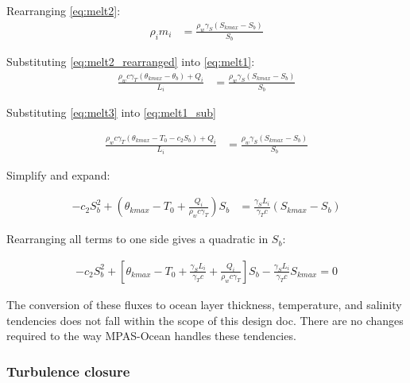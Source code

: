 \documentclass[11pt]{report}
\begin{document}

\noindent
Rearranging \ref{eq:melt2}:
\begin{align}
\rho_i m_i &= \frac{\rho_w \gamma_S (S_{kmax} - S_b)}{S_b} \label{eq:melt2_rearranged}
\end{align}

Substituting \ref{eq:melt2_rearranged} into \ref{eq:melt1}:
\begin{align}
\frac{\rho_w c \gamma_T (\theta_{kmax} - \theta_b) + Q_i}{L_i}
    &= \frac{\rho_w \gamma_S (S_{kmax} - S_b)}{S_b}  \label{eq:melt1_sub}
\end{align}

\noindent
Substituting \ref{eq:melt3} into \ref{eq:melt1_sub}

\begin{align}
\frac{\rho_w c \gamma_T (\theta_{kmax} - T_0 - c_2 S_b) + Q_i}{L_i}
    &= \frac{\rho_w \gamma_S (S_{kmax} - S_b)}{S_b}
\end{align}

\noindent
Simplify and expand:

\begin{align}
- c_2 S_b^2
+ \left( \theta_{kmax} - T_0 + \frac{Q_i}{\rho_w c \gamma_T} \right) S_b
    &= \frac{\gamma_S L_i}{\gamma_T c} (S_{kmax} - S_b)
\end{align}

\noindent
Rearranging all terms to one side gives a quadratic in $S_b$:

\begin{align}
- c_2 S_b^2
+ \left[ \theta_{kmax} - T_0
+ \frac{\gamma_S L_i}{\gamma_T c}
+ \frac{Q_i}{\rho_w c \gamma_T} \right] S_b
- \frac{\gamma_S L_i}{\gamma_T c} S_{kmax} = 0
\end{align}

The conversion of these fluxes to ocean layer thickness, temperature, and salinity tendencies does not fall within the scope of this design doc. There are no changes required to the way MPAS-Ocean handles these tendencies.

\subsubsection{Turbulence closure}\label{sec:turb}
\end{document}

